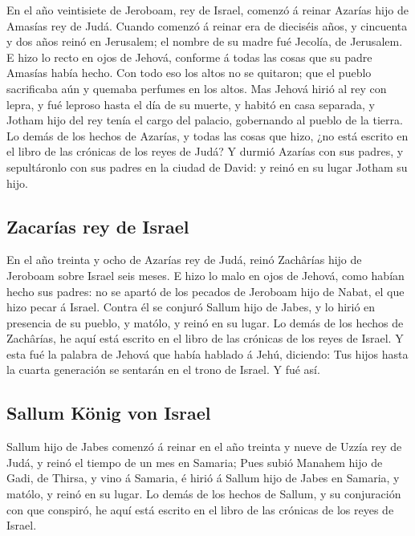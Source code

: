  En el año veintisiete de Jeroboam, rey de Israel, comenzó á
reinar Azarías hijo de Amasías rey de Judá.  Cuando comenzó
á reinar era de dieciséis años, y cincuenta y dos años reinó en
Jerusalem; el nombre de su madre fué Jecolía, de Jerusalem. 
E hizo lo recto en ojos de Jehová, conforme á todas las cosas que su
padre Amasías había hecho.  Con todo eso los altos no se
quitaron; que el pueblo sacrificaba aún y quemaba perfumes en los altos.
 Mas Jehová hirió al rey con lepra, y fué leproso hasta el
día de su muerte, y habitó en casa separada, y Jotham hijo del rey tenía
el cargo del palacio, gobernando al pueblo de la tierra.  Lo
demás de los hechos de Azarías, y todas las cosas que hizo, ¿no está
escrito en el libro de las crónicas de los reyes de Judá?  Y
durmió Azarías con sus padres, y sepultáronlo con sus padres en la
ciudad de David: y reinó en su lugar Jotham su hijo.

\hypertarget{zacaruxedas-rey-de-israel}{%
\subsection{Zacarías rey de Israel}\label{zacaruxedas-rey-de-israel}}

 En el año treinta y ocho de Azarías rey de Judá, reinó
Zachârías hijo de Jeroboam sobre Israel seis meses.  E hizo
lo malo en ojos de Jehová, como habían hecho sus padres: no se apartó de
los pecados de Jeroboam hijo de Nabat, el que hizo pecar á Israel.
 Contra él se conjuró Sallum hijo de Jabes, y lo hirió en
presencia de su pueblo, y matólo, y reinó en su lugar.  Lo
demás de los hechos de Zachârías, he aquí está escrito en el libro de
las crónicas de los reyes de Israel.  Y esta fué la palabra
de Jehová que había hablado á Jehú, diciendo: Tus hijos hasta la cuarta
generación se sentarán en el trono de Israel. Y fué así.

\hypertarget{sallum-kuxf6nig-von-israel}{%
\subsection{Sallum König von Israel}\label{sallum-kuxf6nig-von-israel}}

 Sallum hijo de Jabes comenzó á reinar en el año treinta y
nueve de Uzzía rey de Judá, y reinó el tiempo de un mes en Samaria;
 Pues subió Manahem hijo de Gadi, de Thirsa, y vino á
Samaria, é hirió á Sallum hijo de Jabes en Samaria, y matólo, y reinó en
su lugar.  Lo demás de los hechos de Sallum, y su
conjuración con que conspiró, he aquí está escrito en el libro de las
crónicas de los reyes de Israel.

